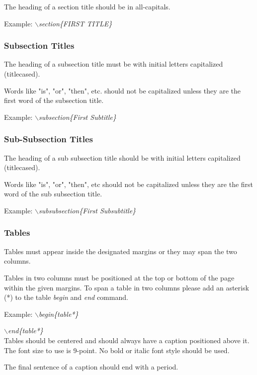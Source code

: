 \documentclass[a4paper,twoside]{article}
\begin{document}
The heading of a section title should be in all-capitals.

Example: \textit{$\backslash$section\{FIRST TITLE\}}

\subsubsection{Subsection Titles}

The heading of a subsection title must be with initial letters
capitalized (titlecased).

Words like "is", "or", "then", etc. should not be capitalized unless
they are the first word of the subsection title.

Example: \textit{$\backslash$subsection\{First Subtitle\}}

\subsubsection{Sub-Subsection Titles}

The heading of a sub subsection title should be with initial letters
capitalized (titlecased).

Words like "is", "or", "then", etc should not be capitalized unless
they are the first word of the sub subsection title.

Example: \textit{$\backslash$subsubsection\{First Subsubtitle\}}

\subsubsection{Tables}

Tables must appear inside the designated margins or they may span
the two columns.

Tables in two columns must be positioned at the top or bottom of the
page within the given margins. To span a table in two columns please add an asterisk (*) to the table \textit{begin} and \textit{end} command.

Example: \textit{$\backslash$begin\{table*\}}

\hspace*{1.5cm}\textit{$\backslash$end\{table*\}}\\

Tables should be centered and should always have a caption
positioned above it. The font size to use is 9-point. No bold or
italic font style should be used.

The final sentence of a caption should end with a period.
\end{document}
